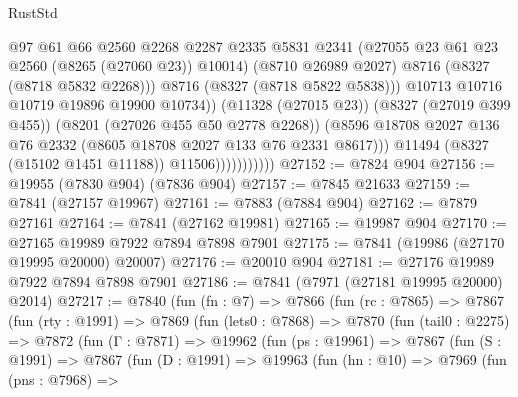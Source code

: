 \begin{lexlean}{RustStd}
\begin{coremodule}
{\begin{coremodule}
{{{{{{{{{{{{{{{{{{{{{{{{{{{{{{{{{{{{{{{{{{{{{{{{{{{{{{                                    @97
                                    @61
                                    @66
                                    @2560
                                    @2268
                                    @2287
                                    @2335
                                    @5831
                                    @2341
                                    (@27055 @23 @61 @23 @2560 (@8265 (@27060 @23)) @10014)
                                    (@8710 @26989 @2027)
                                    @8716
                                    (@8327 (@8718 @5832 @2268)))
                                  @8716
                                  (@8327 (@8718 @5822 @5838)))
                                @10713
                                @10716
                                @10719
                                @19896
                                @19900
                                @10734))
                            (@11328 (@27015 @23))
                            (@8327 (@27019 @399 @455))
                            (@8201 (@27026 @455 @50 @2778 @2268))
                            (@8596
                              @18708
                              @2027
                              @136
                              @76
                              @2332
                              (@8605 @18708 @2027 @133 @76 @2331 @8617)))
                          @11494
                          (@8327 (@15102 @1451 @11188))
                          @11506)))))))))))
@27152 := @7824 @904
@27156 := @19955 (@7830 @904) (@7836 @904)
@27157 := @7845 @21633
@27159 := @7841 (@27157 @19967)
@27161 := @7883 (@7884 @904)
@27162 := @7879 @27161
@27164 := @7841 (@27162 @19981)
@27165 := @19987 @904
@27170 := @27165 @19989 @7922 @7894 @7898 @7901
@27175 := @7841 (@19986 (@27170 @19995 @20000) @20007)
@27176 := @20010 @904
@27181 := @27176 @19989 @7922 @7894 @7898 @7901
@27186 := @7841 (@7971 (@27181 @19995 @20000) @2014)
@27217 := @7840
    (fun (fn : @7) =>
    @7866
      (fun (rc : @7865) =>
      @7867
        (fun (rty : @1991) =>
        @7869
          (fun (lets0 : @7868) =>
          @7870
            (fun (tail0 : @2275) =>
            @7872
              (fun (Γ : @7871) =>
              @19962
                (fun (ps : @19961) =>
                @7867
                  (fun (S : @1991) =>
                  @7867
                    (fun (D : @1991) =>
                    @19963
                      (fun (hn : @10) =>
                      @7969
                        (fun (pns : @7968) =>
}}}}}}}}}}}}}}}}}}}}}}}}}}}}}}}}}}}}}}}}}}}}}}}}}}}}}}
\end{coremodule}}
\end{coremodule}
\end{lexlean}
